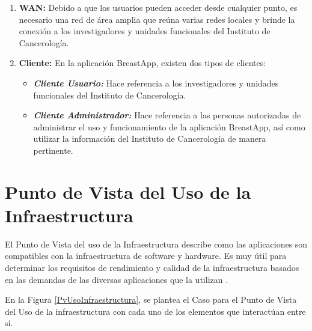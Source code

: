 \begin{enumerate}[label=\textbf{\arabic*})]
\item \textbf{WAN:}  Debido a  que los usuarios pueden acceder desde cualquier punto,
es necesario una red de área amplia que reúna varias redes locales y brinde la conexión a los investigadores y unidades funcionales del Instituto de Cancerología. 

\item \textbf{Cliente:} En la aplicación BreastApp, existen dos tipos de clientes:

\begin{itemize}
	\item  \textbf{\textit{Cliente Usuario:}} Hace referencia a los  investigadores y unidades funcionales del Instituto de Cancerología.
	
	\item  \textbf{\textit{Cliente Administrador:}} Hace referencia a las personas autorizadas de administrar el uso y funcionamiento de la aplicación BreastApp, así como utilizar la información del Instituto de Cancerología de manera pertinente.
\end{itemize}
\end{enumerate}

\newpage
\section{Punto de Vista del Uso de la Infraestructura}
El Punto de Vista del uso de la  Infraestructura describe como las aplicaciones son compatibles con la infraestructura de software y hardware. Es muy útil para determinar los requisitos de
rendimiento y calidad de la infraestructura basados en las demandas de las diversas aplicaciones que la utilizan \cite{BolanosCastro2019}.

En la Figura \ref{PvUsoInfraestructura}, se plantea el Caso para el Punto de Vista del Uso de la infraestructura con cada uno de los elementos que interactúan entre sí. 

